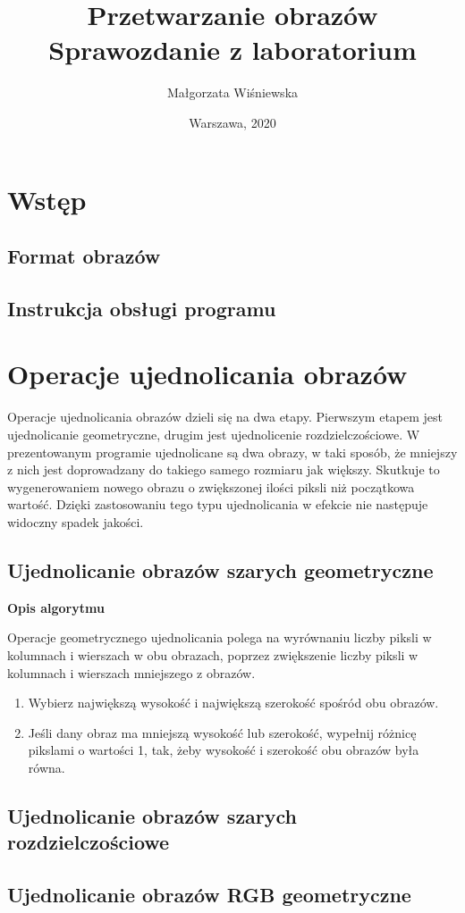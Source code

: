 \documentclass[a4paper,12pt, titlepage]{report}
\title{Przetwarzanie obrazów\\Sprawozdanie z laboratorium}
\author{Małgorzata Wiśniewska}
\date{Warszawa, 2020}
\begin{document}
\maketitle
\tableofcontents
\chapter{Wstęp}
\section{Format obrazów}
\section{Instrukcja obsługi programu}

\chapter{Operacje ujednolicania obrazów}
Operacje ujednolicania obrazów dzieli się na dwa etapy. Pierwszym etapem jest ujednolicanie geometryczne, drugim jest ujednolicenie rozdzielczościowe. W prezentowanym programie ujednolicane są dwa obrazy, w taki sposób, że mniejszy z nich jest doprowadzany do takiego samego rozmiaru jak większy. Skutkuje to wygenerowaniem nowego obrazu o zwiększonej ilości piksli niż początkowa wartość. Dzięki zastosowaniu tego typu ujednolicania w efekcie nie następuje widoczny spadek jakości. 
\section{Ujednolicanie obrazów szarych geometryczne}
\textbf{Opis algorytmu}
\par Operacje geometrycznego ujednolicania polega na wyrównaniu liczby piksli w kolumnach i wierszach w obu obrazach, poprzez zwiększenie liczby piksli w kolumnach i wierszach mniejszego z obrazów.
\begin{enumerate}
\item Wybierz największą wysokość i największą szerokość spośród obu obrazów.
\item Jeśli dany obraz ma mniejszą wysokość lub szerokość, wypełnij różnicę pikslami o wartości 1, tak, żeby wysokość i szerokość obu obrazów była równa.
\end{enumerate}
\section{Ujednolicanie obrazów szarych rozdzielczościowe}
\section{Ujednolicanie obrazów RGB geometryczne}
\end{document}
